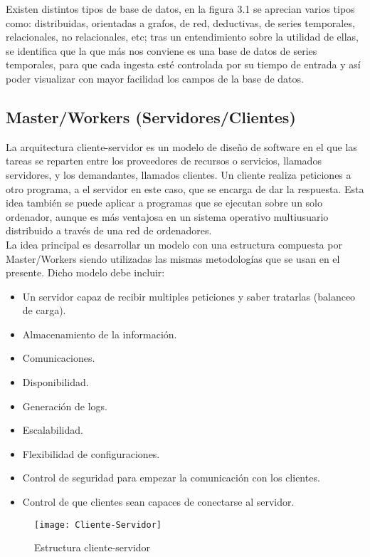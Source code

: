 \documentclass[ spanish, a4paper, 12pt, oneside]{report}
\begin{document}
Existen distintos tipos de base de datos, en la figura 3.1 se aprecian varios tipos como: distribuidas, orientadas a grafos, de red, deductivas, de series temporales, relacionales, no relacionales, etc; tras un  
entendimiento sobre la utilidad de ellas, se identifica que la que más nos conviene es una base de datos de series temporales, para que cada ingesta esté controlada por su 
tiempo de entrada y así poder visualizar con mayor facilidad los campos de la base de datos. \\


\subsection{Master/Workers (Servidores/Clientes)}
La arquitectura cliente-servidor es un modelo de diseño de software en el que las tareas se reparten entre los proveedores de recursos o servicios, llamados servidores, y los demandantes, llamados clientes. Un cliente 
realiza peticiones a otro programa, a el servidor en este caso, que se encarga de dar la respuesta. Esta idea también se puede aplicar a programas que se ejecutan sobre un solo ordenador, aunque es más ventajosa en un sistema operativo multiusuario 
distribuido a través de una red de ordenadores.\\

La idea principal es desarrollar un modelo con una estructura compuesta por Master/Workers siendo utilizadas las mismas metodologías que se usan en el presente. Dicho modelo debe incluir: \\

\begin{itemize}
   \item Un servidor capaz de recibir multiples peticiones y saber tratarlas (balanceo de carga).
   \item Almacenamiento de la información.
   \item Comunicaciones.
   \item Disponibilidad.
   \item Generación de logs.
   \item Escalabilidad.
   \item Flexibilidad de configuraciones.
   \item Control de seguridad para empezar la comunicación con los clientes.
   \item Control de que clientes sean capaces de conectarse al servidor.
\end{itemize}

\begin{figure}[!h]
   \centering
   \texttt{[image: Cliente-Servidor]}\\
      \caption{\label{fig: Estructura cliente-servidor} Estructura cliente-servidor}
\end{figure}
\end{document}

